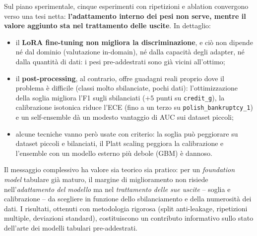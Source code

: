 \documentclass[11pt,a4paper]{article}
\begin{document}
Sul piano sperimentale, cinque esperimenti con ripetizioni e ablation
convergono verso una tesi netta: \textbf{l'adattamento interno dei pesi non
serve, mentre il valore aggiunto sta nel trattamento delle uscite}. In
dettaglio:
\begin{itemize}[nosep]
  \item il \textbf{LoRA fine-tuning non migliora la discriminazione}, e ciò non
  dipende né dal dominio (valutazione in-domain), né dalla capacità degli adapter,
  né dalla quantità di dati: i pesi pre-addestrati sono già vicini all'ottimo;
  \item il \textbf{post-processing}, al contrario, offre guadagni reali proprio
  dove il problema è difficile (classi molto sbilanciate, pochi dati):
  l'ottimizzazione della soglia migliora l'F1 sugli sbilanciati ($+5$ punti su
  \texttt{credit\_g}), la calibrazione isotonica riduce l'ECE (fino a un terzo su
  \texttt{polish\_bankruptcy\_1}) e un self-ensemble dà un modesto vantaggio di
  AUC sui dataset piccoli;
  \item alcune tecniche vanno però usate con criterio: la soglia può peggiorare
  su dataset piccoli e bilanciati, il Platt scaling peggiora la calibrazione e
  l'ensemble con un modello esterno più debole (GBM) è dannoso.
\end{itemize}

Il messaggio complessivo ha valore sia teorico sia pratico: per un
\emph{foundation model} tabulare già maturo, il margine di miglioramento non
risiede nell'\emph{adattamento del modello} ma nel \emph{trattamento delle sue
uscite} -- soglia e calibrazione -- da scegliere in funzione dello sbilanciamento
e della numerosità dei dati. I risultati, ottenuti con metodologia rigorosa
(split anti-leakage, ripetizioni multiple, deviazioni standard), costituiscono un
contributo informativo sullo stato dell'arte dei modelli tabulari pre-addestrati.

\appendix
\end{document}
